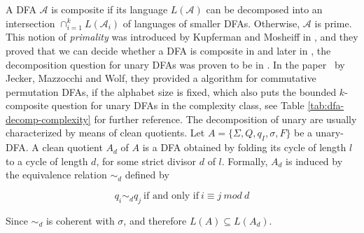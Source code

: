 A DFA $\mathcal{A}$ is composite if its language $L(\mathcal{A})$ can be decomposed into an intersection $\cap^k_{i=1} L(\mathcal{A}_i)$ of languages of smaller DFAs. Otherwise, $\mathcal{A}$ is prime. This notion of \textit{primality} was introduced by Kupferman and Mosheiff in \cite{prime-languages}, and they proved that we can decide whether a DFA is composite in \ExpSpace and later in \cite{unara-prime-languages}, the decomposition question for unary DFAs was proven to be in \LogSpace. In the paper~\cite{DBLP:journals/corr/abs-2107-04683} by Jecker, Mazzocchi and Wolf, they provided a \LogSpace algorithm for commutative permutation DFAs, if the alphabet size is fixed, which also puts the bounded $k$-composite question for unary DFAs in the \LogSpace complexity class, see Table \ref{tab:dfa-decomp-complexity} for further reference. The decomposition of unary \DFAs are usually characterized by means of clean quotients. Let  $A = \lbrace\Sigma, Q, q_I , \sigma, F\rbrace$ be a unary-DFA. A clean quotient $A_d$ of $A$ is a DFA obtained by folding its cycle of length $l$ to a cycle of length $d$, for some strict divisor $d$ of $l$. Formally, $A_d$ is induced by the equivalence relation $\sim_d$ defined by

\[ q_i \sim_d q_j ~\text{if and only if}~i \equiv j ~mod~ d \]

Since $\sim_d$ is coherent with $\sigma$, and therefore $L(A) \subseteq L(A_d)$.

